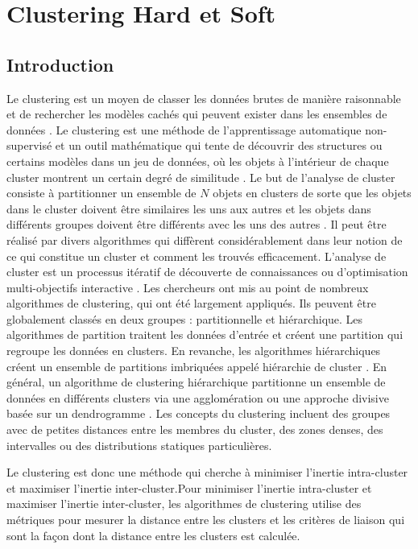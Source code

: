 \chapter{Clustering Hard et Soft}
\minitoc
\thispagestyle{empty}
\newpage

\section{Introduction}
Le clustering est un moyen de classer les données brutes de manière raisonnable et de rechercher les modèles cachés qui peuvent exister dans les ensembles de données \cite{huang1998extensions}.
Le clustering est une méthode de l’apprentissage automatique non-supervisé et un outil mathématique qui tente de découvrir des structures ou certains modèles dans un jeu de données, où les objets à l'intérieur de chaque cluster montrent un certain degré de similitude \cite{sasirekha2013agglomerative}. Le but de l'analyse de cluster consiste à partitionner un ensemble de \(\displaystyle N \) objets en clusters de sorte que les objets dans le cluster doivent être similaires les uns aux autres et les objets dans différents groupes doivent être différents avec les uns des autres \cite{yang1993survey}. Il peut être réalisé par divers algorithmes qui diffèrent considérablement dans leur notion de ce qui constitue un cluster et comment les trouvés efficacement. L'analyse de cluster est un processus itératif de découverte de connaissances ou d'optimisation multi-objectifs interactive \cite{sasirekha2013agglomerative}. Les chercheurs ont mis au point de nombreux algorithmes de clustering, qui ont été largement appliqués. Ils peuvent être globalement classés en deux groupes : partitionnelle et hiérarchique. Les algorithmes de partition traitent les données d'entrée et créent une partition qui regroupe les données en clusters. En revanche, les algorithmes hiérarchiques créent un ensemble de partitions imbriquées appelé hiérarchie de cluster \cite{zhou2016method}. En général, un algorithme de clustering hiérarchique partitionne un ensemble de données en différents clusters via une agglomération ou une approche divisive basée sur un dendrogramme \cite{zhong2011minimum}.
Les concepts du clustering incluent des groupes avec de petites distances entre les membres du cluster, des zones denses, des intervalles ou des distributions statiques particulières.

Le clustering est donc une méthode qui cherche à minimiser l’inertie intra-cluster et maximiser l’inertie inter-cluster.Pour minimiser l’inertie intra-cluster et maximiser l’inertie inter-cluster, les algorithmes de clustering utilise des métriques pour mesurer la distance entre les clusters et les critères de liaison qui sont la façon dont la distance entre les clusters est calculée. \\

